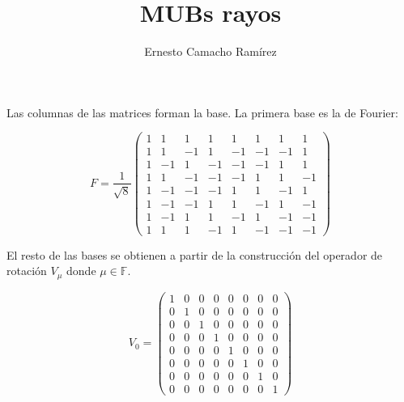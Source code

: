 \documentclass[a4paper]{article}
\title{MUBs rayos}
\author{Ernesto Camacho Ramírez}
\begin{document}
  \maketitle
  
  Las columnas de las matrices forman la base. La primera
  base es la de Fourier:

  \begin{equation}
    F =
    \frac{1}{\sqrt{8}}\displaystyle \left(\begin{array}{rrrrrrrr}
1 & 1 & 1 & 1 & 1 & 1 & 1 & 1 \\
1 & 1 & -1 & 1 & -1 & -1 & -1 & 1 \\
1 & -1 & 1 & -1 & -1 & -1 & 1 & 1 \\
1 & 1 & -1 & -1 & -1 & 1 & 1 & -1 \\
1 & -1 & -1 & -1 & 1 & 1 & -1 & 1 \\
1 & -1 & -1 & 1 & 1 & -1 & 1 & -1 \\
1 & -1 & 1 & 1 & -1 & 1 & -1 & -1 \\
1 & 1 & 1 & -1 & 1 & -1 & -1 & -1
\end{array}\right)
  \end{equation}

  El resto de las bases se obtienen a partir de la
  construcción del operador de rotación $V_\mu$ donde $\mu
  \in \mathbb F$. 

  \begin{equation}
    V_0 = 
    \displaystyle \left(\begin{array}{rrrrrrrr}
1 & 0 & 0 & 0 & 0 & 0 & 0 & 0 \\
0 & 1 & 0 & 0 & 0 & 0 & 0 & 0 \\
0 & 0 & 1 & 0 & 0 & 0 & 0 & 0 \\
0 & 0 & 0 & 1 & 0 & 0 & 0 & 0 \\
0 & 0 & 0 & 0 & 1 & 0 & 0 & 0 \\
0 & 0 & 0 & 0 & 0 & 1 & 0 & 0 \\
0 & 0 & 0 & 0 & 0 & 0 & 1 & 0 \\
0 & 0 & 0 & 0 & 0 & 0 & 0 & 1
\end{array}\right)
  \end{equation}
\end{document}
